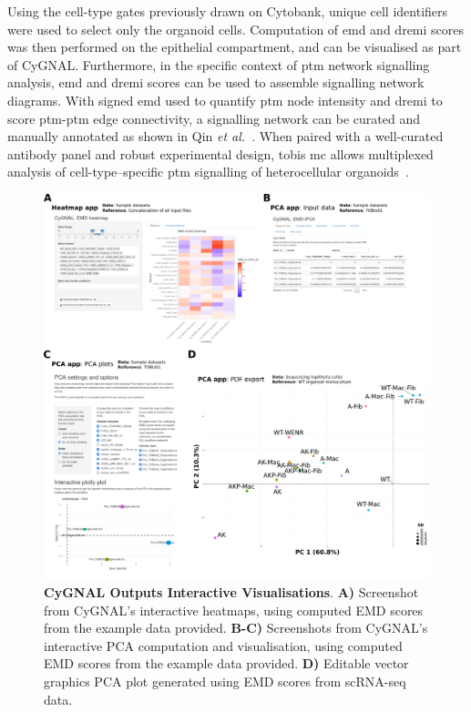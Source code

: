 Using the cell-type gates previously drawn on Cytobank, unique cell identifiers were used to select only the organoid cells. Computation of \acrshort{emd} and \acrshort{dremi} scores was then performed on the epithelial compartment, and can be visualised as part of CyGNAL. Furthermore, in the specific context of \acrshort{ptm} network signalling analysis, \acrshort{emd} and \acrshort{dremi} scores can be used to assemble signalling network diagrams. With signed \acrshort{emd} used to quantify \acrshort{ptm} node intensity and \acrshort{dremi} to score \acrshort{ptm}-\acrshort{ptm} edge connectivity, a signalling network can be curated and manually annotated as shown in Qin \emph{et al.}~\cite{qin_cell-type-specific_2020}. When paired with a well-curated antibody panel and robust experimental design, \acrshort{tobis} \acrshort{mc} allows multiplexed analysis of cell-type–specific \acrshort{ptm} signalling of heterocellular organoids~\cite{sufi_multiplexed_2021}. 

\begin{figure}
    \centering
    \includegraphics{03cytof/figs/3CYGNAL_usageVIS.png}
    \caption{\textbf{CyGNAL Outputs Interactive Visualisations}. \textbf{A)} Screenshot from CyGNAL's interactive heatmaps, using computed EMD scores from the example data provided. \textbf{B-C)} Screenshots from CyGNAL's interactive PCA computation and visualisation, using computed EMD scores from the example data provided. \textbf{D)} Editable vector graphics PCA plot generated using EMD scores from scRNA-seq data.}
    \label{fig:3cygvis}
\end{figure}

